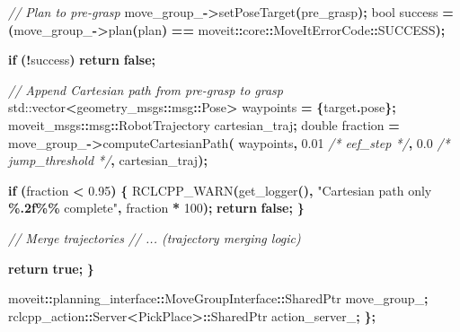\documentclass[
]{article}
\newenvironment{Shaded}{\begin{snugshade}}{\end{snugshade}}
\newcommand{\BuiltInTok}[1]{#1}
\newcommand{\CommentTok}[1]{\textcolor[rgb]{0.56,0.35,0.01}{\textit{#1}}}
\newcommand{\ControlFlowTok}[1]{\textcolor[rgb]{0.13,0.29,0.53}{\textbf{#1}}}
\newcommand{\DataTypeTok}[1]{\textcolor[rgb]{0.13,0.29,0.53}{#1}}
\newcommand{\DecValTok}[1]{\textcolor[rgb]{0.00,0.00,0.81}{#1}}
\newcommand{\FloatTok}[1]{\textcolor[rgb]{0.00,0.00,0.81}{#1}}
\newcommand{\KeywordTok}[1]{\textcolor[rgb]{0.13,0.29,0.53}{\textbf{#1}}}
\newcommand{\NormalTok}[1]{#1}
\newcommand{\OperatorTok}[1]{\textcolor[rgb]{0.81,0.36,0.00}{\textbf{#1}}}
\newcommand{\SpecialCharTok}[1]{\textcolor[rgb]{0.81,0.36,0.00}{\textbf{#1}}}
\newcommand{\StringTok}[1]{\textcolor[rgb]{0.31,0.60,0.02}{#1}}
\newcommand{\VariableTok}[1]{\textcolor[rgb]{0.00,0.00,0.00}{#1}}
\begin{document}
\begin{Shaded}
\begin{Highlighting}[]
        \CommentTok{// Plan to pre{-}grasp}
        \VariableTok{move\_group\_}\OperatorTok{{-}\textgreater{}}\NormalTok{setPoseTarget}\OperatorTok{(}\NormalTok{pre\_grasp}\OperatorTok{);}
        \DataTypeTok{bool}\NormalTok{ success }\OperatorTok{=} \OperatorTok{(}\VariableTok{move\_group\_}\OperatorTok{{-}\textgreater{}}\NormalTok{plan}\OperatorTok{(}\NormalTok{plan}\OperatorTok{)} \OperatorTok{==}\NormalTok{ moveit}\OperatorTok{::}\NormalTok{core}\OperatorTok{::}\NormalTok{MoveItErrorCode}\OperatorTok{::}\NormalTok{SUCCESS}\OperatorTok{);}

        \ControlFlowTok{if} \OperatorTok{(!}\NormalTok{success}\OperatorTok{)} \ControlFlowTok{return} \KeywordTok{false}\OperatorTok{;}

        \CommentTok{// Append Cartesian path from pre{-}grasp to grasp}
        \BuiltInTok{std::}\NormalTok{vector}\OperatorTok{\textless{}}\NormalTok{geometry\_msgs}\OperatorTok{::}\NormalTok{msg}\OperatorTok{::}\NormalTok{Pose}\OperatorTok{\textgreater{}}\NormalTok{ waypoints }\OperatorTok{=} \OperatorTok{\{}\NormalTok{target}\OperatorTok{.}\NormalTok{pose}\OperatorTok{\};}
\NormalTok{        moveit\_msgs}\OperatorTok{::}\NormalTok{msg}\OperatorTok{::}\NormalTok{RobotTrajectory cartesian\_traj}\OperatorTok{;}
        \DataTypeTok{double}\NormalTok{ fraction }\OperatorTok{=} \VariableTok{move\_group\_}\OperatorTok{{-}\textgreater{}}\NormalTok{computeCartesianPath}\OperatorTok{(}
\NormalTok{            waypoints}\OperatorTok{,} \FloatTok{0.01} \CommentTok{/* eef\_step */}\OperatorTok{,} \FloatTok{0.0} \CommentTok{/* jump\_threshold */}\OperatorTok{,}\NormalTok{ cartesian\_traj}\OperatorTok{);}

        \ControlFlowTok{if} \OperatorTok{(}\NormalTok{fraction }\OperatorTok{\textless{}} \FloatTok{0.95}\OperatorTok{)} \OperatorTok{\{}
\NormalTok{            RCLCPP\_WARN}\OperatorTok{(}\NormalTok{get\_logger}\OperatorTok{(),} \StringTok{"Cartesian path only }\SpecialCharTok{\%.2f\%\%}\StringTok{ complete"}\OperatorTok{,}\NormalTok{ fraction }\OperatorTok{*} \DecValTok{100}\OperatorTok{);}
            \ControlFlowTok{return} \KeywordTok{false}\OperatorTok{;}
        \OperatorTok{\}}

        \CommentTok{// Merge trajectories}
        \CommentTok{// ... (trajectory merging logic)}

        \ControlFlowTok{return} \KeywordTok{true}\OperatorTok{;}
    \OperatorTok{\}}

\NormalTok{    moveit}\OperatorTok{::}\NormalTok{planning\_interface}\OperatorTok{::}\NormalTok{MoveGroupInterface}\OperatorTok{::}\NormalTok{SharedPtr }\VariableTok{move\_group\_}\OperatorTok{;}
\NormalTok{    rclcpp\_action}\OperatorTok{::}\NormalTok{Server}\OperatorTok{\textless{}}\NormalTok{PickPlace}\OperatorTok{\textgreater{}::}\NormalTok{SharedPtr }\VariableTok{action\_server\_}\OperatorTok{;}
\OperatorTok{\};}
\end{Highlighting}
\end{Shaded}
\end{document}
